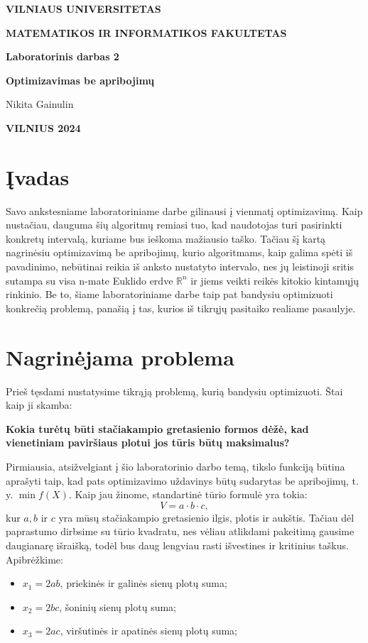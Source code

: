 \documentclass{article}
\begin{document}
\newlength{\mywidth}
\settowidth{\mywidth}{Darbo vadovas:}
\begin{titlepage}
    \vskip 20pt
    \centerline{\bf \large VILNIAUS UNIVERSITETAS}
    \bigskip
    \centerline{\large \textbf{MATEMATIKOS IR INFORMATIKOS FAKULTETAS}}
    \vskip 120pt
    \centerline{\bf \Large \textbf{Laboratorinis darbas 2}}
    \vskip 50pt
    \begin{center}
        {\bf \LARGE Optimizavimas be apribojimų}
    \end{center}
    \bigskip
    \bigskip
    \centerline{\Large Nikita Gainulin}
    \vskip 90pt
    \vskip 200pt
    \centerline{\large \textbf{VILNIUS 2024}}
\end{titlepage}

\tableofcontents

\clearpage
\section{Įvadas}
Savo ankstesniame laboratoriniame darbe gilinausi į vienmatį optimizavimą. Kaip nustačiau, dauguma šių algoritmų remiasi tuo, kad naudotojas turi pasirinkti konkretų intervalą, kuriame bus ieškoma mažiausio taško. Tačiau šį kartą nagrinėsiu optimizavimą be apribojimų, kurio algoritmams, kaip galima spėti iš pavadinimo, nebūtinai reikia iš anksto nustatyto intervalo, nes jų leistinoji sritis sutampa su visa n-mate Euklido erdve $\mathbb{R}^n$ ir jiems veikti reikės kitokio kintamųjų rinkinio. Be to, šiame laboratoriniame darbe taip pat bandysiu optimizuoti konkrečią problemą, panašią į tas, kurios iš tikrųjų pasitaiko realiame pasaulyje.
\section{Nagrinėjama problema}
Prieš tęsdami nustatysime tikrąją problemą, kurią bandysiu optimizuoti. Štai kaip ji skamba:

\textbf{Kokia turėtų būti stačiakampio gretasienio formos dėžė, kad vienetiniam paviršiaus plotui jos tūris būtų maksimalus?}

Pirmiausia, atsižvelgiant į šio laboratorinio darbo temą, tikslo funkciją būtina aprašyti taip, kad pats optimizavimo uždavinys būtų sudarytas be apribojimų, t. y. $\min f(X)$. Kaip jau žinome, standartinė tūrio formulė yra tokia:
\begin{equation*}
    V = a\cdot b\cdot c,
\end{equation*}
kur $a, b$ ir $c$ yra mūsų stačiakampio gretasienio ilgis, plotis ir aukštis. Tačiau dėl paprastumo dirbsime su tūrio kvadratu, nes vėliau atlikdami pakeitimą gausime daugianarę išraišką, todėl bus daug lengviau rasti išvestines ir kritinius taškus. Apibrėžkime:
\begin{itemize}
    \item $x_{1} = 2ab$, priekinės ir galinės sienų plotų suma;
    \item $x_{2} = 2bc$, šoninių sienų plotų suma;
    \item $x_{3} = 2ac$, viršutinės ir apatinės sienų plotų suma;
\end{itemize}
\end{document}
